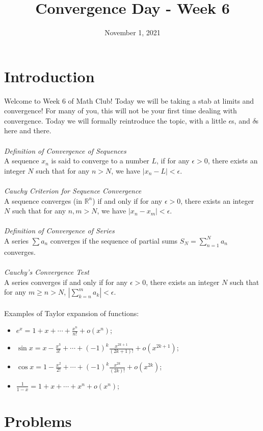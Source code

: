 \documentclass{article}
\title{Convergence Day - Week 6}
\author{}
\date{November 1, 2021}
\begin{document}
\section{Introduction}

Welcome to Week 6 of Math Club! Today we will be taking a stab at limits and convergence! For many of you, this will not be your first time dealing with convergence. Today we will formally reintroduce the topic, with a little $\epsilon$s, and $\delta$s here and there. 
\\\\
\emph{Definition of Convergence of Sequences} \\
A sequence $x_n$ is said to converge to a number $L$, if for any $\epsilon > 0$, there exists an integer $N$ such that for any $n > N$, we have $|x_n - L| < \epsilon$. 
\\\\
\emph{Cauchy Criterion for Sequence Convergence} \\
A sequence converges (in $\mathbb{R}^n$) if and only if for any $\epsilon > 0$, there exists an integer $N$ such that for any $n,m > N$, we have $|x_n - x_m| < \epsilon$.
\\\\
\emph{Definition of Convergence of Series} \\
A series $\sum a_{n}$ converges if the sequence of partial sums $S_{N} = \sum_{n = 1}^{N} a_{n}$ converges.  
\\\\
\emph{Cauchy's Convergence Test} \\
A series converges if and only if for any $\epsilon > 0$, there exists an integer $N$ such that for any $m \geq n > N$, $|\sum_{k = n}^{m} a_{k}| < \epsilon$.
\\\\
Examples of Taylor expansion of functions: 
\begin{itemize}
    \item $e^{x} = 1 + x + \cdots + \frac{x^{n}}{n!} + o(x^{n})$;
    \item $\sin x = x - \frac{x^{3}}{3!} + \cdots + (-1)^{k} \frac{x^{2k + 1}}{(2k + 1)!} + o(x^{2k + 1})$; 
    \item $\cos x = 1 - \frac{x^{2}}{2!} + \cdots + (-1)^{k} \frac{x^{2k}}{(2k)!} + o(x^{2k})$; 
    \item $\frac{1}{1 - x} = 1 + x + \cdots + x^{n} + o(x^{n})$;
\end{itemize}


\section{Problems}
\end{document}
